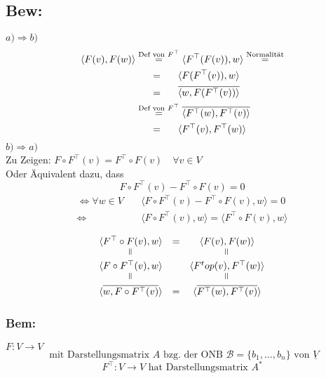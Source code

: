 \documentclass[titlepage,12pt,a4paper,ngerman]{report}
\newcommand{\tx}[1]{\textrm{#1}}
\newcommand{\basis}[3]{\{#1_{#2}, \dots, #1_{#3}\}}
\begin{document}
\subsection{Bew:}
$ \boxed{a) \Rightarrow b)} $\\
\begin{align*}
\langle F(v) , F(w) \rangle &\buildrel \tx{Def von }F^\top \over = \langle F^\top(F(v)) , w \rangle \buildrel \tx{Normalität} \over =\\
&\quad \ \, = \quad \ \, \langle F(F^\top(v)) , w \rangle \\
&\quad \ \, = \quad \ \, \overline{\langle w , F(F^\top(v)) \rangle}\\
&\buildrel \tx{Def von } F^\top \over = \overline{\langle F^\top(w) , F^\top(v) \rangle } \\
&\quad \ \, = \quad \ \, \langle F^\top(v) , F^\top (w)\rangle
\end{align*}
$ \boxed{b) \Rightarrow a)} $\\
Zu Zeigen: $ F \circ F^\top(v) = F^\top \circ F(v)  \quad \forall v \in V $\\
Oder Äquivalent dazu, dass $$ F \circ F^\top(v) - F^\top \circ F(v) = 0 $$
\begin{align*}
\Leftrightarrow \forall w \in V \quad &\langle F \circ F^\top(v) - F^\top \circ F(v) , w \rangle = 0\\
\Leftrightarrow \qquad\qquad \ \;  &\langle F \circ F^\top (v) , w \rangle = \langle F^\top \circ F(v) , w \rangle
\end{align*}

$$\begin{array}{ccc}
\langle F^\top \circ F(v), w \rangle &=& \langle F(v) , F(w) \rangle \\ \rotatebox{90}{$\,=$}& & \rotatebox{90}{$\,=$}\\ \langle F \circ F^\top (v) , w \rangle & & \langle F^top (v) , F^\top (w) \rangle \\ \rotatebox{90}{$\,=$} & & \rotatebox{90}{$\,=$} \\
\langle \overline{ w, F \circ F^\top (v)}\rangle & = & \langle \overline{F^\top (w), F^\top (v)} \rangle
\end{array}$$

\subsubsection{Bem:}  $F: V \to V$ 
$$\tx{ mit Darstellungsmatrix $A$ bzg. der ONB } \mathcal B =\basis{b}{1}{n} \tx{ von } \underline{V}$$
$$F^\top : V \to V \tx{ hat Darstellungsmatrix } A^*$$
\end{document}
